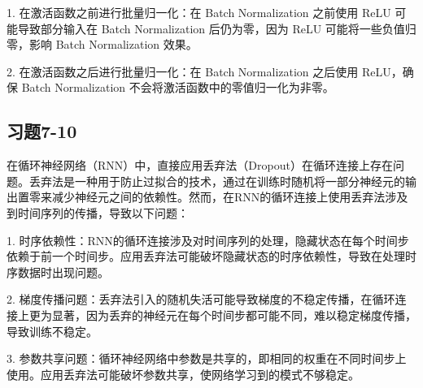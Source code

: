 \documentclass[]{article}
\begin{document}
1. 在激活函数之前进行批量归一化：在 Batch Normalization 之前使用 ReLU 可能导致部分输入在 Batch Normalization 后仍为零，因为 ReLU 可能将一些负值归零，影响 Batch Normalization 效果。

2. 在激活函数之后进行批量归一化：在 Batch Normalization 之后使用 ReLU，确保 Batch Normalization 不会将激活函数中的零值归一化为非零。

\subsection{习题7-10}
在循环神经网络（RNN）中，直接应用丢弃法（Dropout）在循环连接上存在问题。丢弃法是一种用于防止过拟合的技术，通过在训练时随机将一部分神经元的输出置零来减少神经元之间的依赖性。然而，在RNN的循环连接上使用丢弃法涉及到时间序列的传播，导致以下问题：

1. 时序依赖性：RNN的循环连接涉及对时间序列的处理，隐藏状态在每个时间步依赖于前一个时间步。应用丢弃法可能破坏隐藏状态的时序依赖性，导致在处理时序数据时出现问题。

2. 梯度传播问题：丢弃法引入的随机失活可能导致梯度的不稳定传播，在循环连接上更为显著，因为丢弃的神经元在每个时间步都可能不同，难以稳定梯度传播，导致训练不稳定。

3. 参数共享问题：循环神经网络中参数是共享的，即相同的权重在不同时间步上使用。应用丢弃法可能破坏参数共享，使网络学习到的模式不够稳定。
\end{document}

